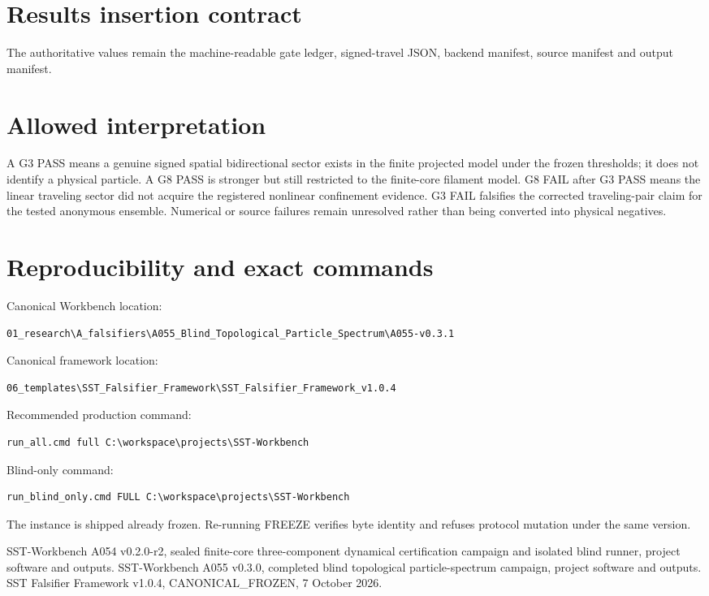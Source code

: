 \documentclass[11pt,a4paper]{article}
\begin{document}
\section{Results insertion contract}
The authoritative values remain the machine-readable gate ledger, signed-travel JSON, backend manifest, source manifest and output manifest.

\section{Allowed interpretation}
A G3 PASS means a genuine signed spatial bidirectional sector exists in the finite projected model under the frozen thresholds; it does not identify a physical particle. A G8 PASS is stronger but still restricted to the finite-core filament model. G8 FAIL after G3 PASS means the linear traveling sector did not acquire the registered nonlinear confinement evidence. G3 FAIL falsifies the corrected traveling-pair claim for the tested anonymous ensemble. Numerical or source failures remain unresolved rather than being converted into physical negatives.

\section{Reproducibility and exact commands}
Canonical Workbench location:
\begin{verbatim}
01_research\A_falsifiers\A055_Blind_Topological_Particle_Spectrum\A055-v0.3.1
\end{verbatim}
Canonical framework location:
\begin{verbatim}
06_templates\SST_Falsifier_Framework\SST_Falsifier_Framework_v1.0.4
\end{verbatim}
Recommended production command:
\begin{verbatim}
run_all.cmd full C:\workspace\projects\SST-Workbench
\end{verbatim}
Blind-only command:
\begin{verbatim}
run_blind_only.cmd FULL C:\workspace\projects\SST-Workbench
\end{verbatim}
The instance is shipped already frozen. Re-running FREEZE verifies byte identity and refuses protocol mutation under the same version.

\begin{thebibliography}{9}
 SST-Workbench A054 v0.2.0-r2, sealed finite-core three-component dynamical certification campaign and isolated blind runner, project software and outputs.
 SST-Workbench A055 v0.3.0, completed blind topological particle-spectrum campaign, project software and outputs.
 SST Falsifier Framework v1.0.4, CANONICAL\_FROZEN, 7 October 2026.
\end{thebibliography}
\end{document}
